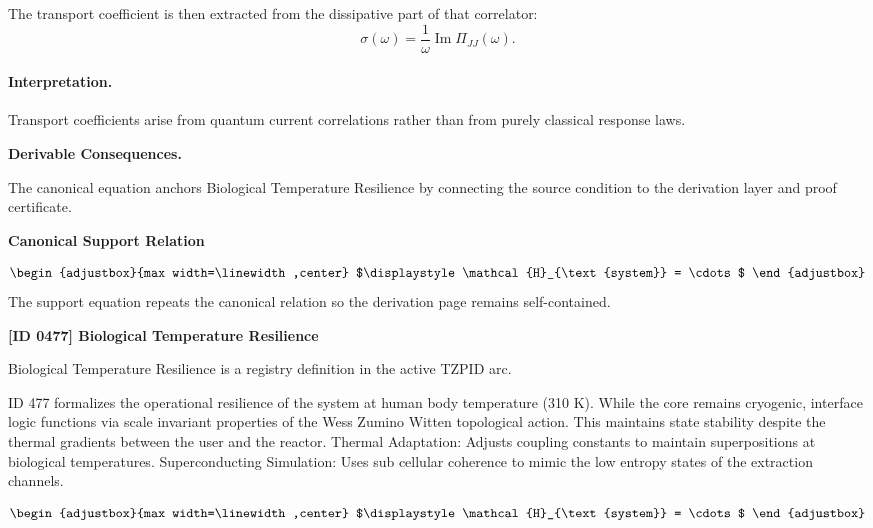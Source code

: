 The transport coefficient is then extracted from the dissipative part of that correlator:
\begin{equation}
\boxed{
\sigma(\omega)
=
\frac{1}{\omega}
\operatorname{Im}\Pi_{JJ}(\omega).
}
\end{equation}

\paragraph{Interpretation.}
Transport coefficients arise from quantum current correlations rather than from purely classical response laws.

\par\vspace{0.35em}
\noindent\textbf{Derivable Consequences.}\quad
\begingroup
\footnotesize
\raggedright
The canonical equation anchors Biological Temperature Resilience by connecting the source condition to the derivation layer and proof certificate.
\par\endgroup

\noindent\textbf{Canonical Support Relation}\par
\[
\begin{adjustbox}{max width=\linewidth,center}
$\displaystyle
\mathcal{H}_{\text{system}} = \cdots
$
\end{adjustbox}
\]
\noindent The support equation repeats the canonical relation so the derivation page remains self-contained.\par

\clearpage
\noindent\textbf{[ID 0477] Biological Temperature Resilience}\par
\vspace{0.35em}
\begingroup\small
{}
Biological Temperature Resilience is a registry definition in the active TZPID arc.

ID 477 formalizes the operational resilience of the system at human body temperature (310 K). While the core remains cryogenic, interface logic functions via scale invariant properties of the Wess Zumino Witten topological action. This maintains state stability despite the thermal gradients between the user and the reactor. Thermal Adaptation: Adjusts coupling constants to maintain superpositions at biological temperatures. Superconducting Simulation: Uses sub cellular coherence to mimic the low entropy states of the extraction channels.

\[
\begin{adjustbox}{max width=\linewidth,center}
$\displaystyle
\mathcal{H}_{\text{system}} = \cdots
$
\end{adjustbox}
\]

